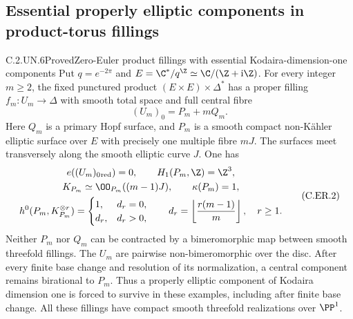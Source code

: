 \subsection{Essential properly elliptic components in product-torus fillings}

\begin{statement}{C.2.UN.6}{Proved}{Zero-Euler product fillings with essential Kodaira-dimension-one components}
Put $q=e^{-2\pi}$ and $E=\C^*/q^{\Z}\simeq\C/(\Z+\mathrm i\Z)$.
For every integer $m\ge2$, the fixed punctured product
$(E\times E)\times\Delta^*$ has a proper filling
$f_m:U_m\to\Delta$ with smooth total space and full central fibre
\[
                    (U_m)_0=P_m+mQ_m.             \tag{C.ER.1}
\]
Here $Q_m$ is a primary Hopf surface, and $P_m$ is a smooth compact
non-K\"ahler elliptic surface over $E$ with precisely one multiple
fibre $mJ$. The surfaces meet transversely along the smooth elliptic
curve $J$. One has
\[
 \begin{gathered}
 e((U_m)_0{}_{\rm red})=0,\qquad H_1(P_m,\Z)=\Z^3,\\
 K_{P_m}\simeq\OO_{P_m}((m-1)J),\qquad \kappa(P_m)=1,\\
 h^0(P_m,K_{P_m}^{\otimes r})=
 \begin{cases}
 1,&d_r=0,\\
 d_r,&d_r>0,
 \end{cases}
 \qquad d_r=\left\lfloor\frac{r(m-1)}m\right\rfloor,
 \quad r\ge1.
 \end{gathered}                                   \tag{C.ER.2}
\]
Neither $P_m$ nor $Q_m$ can be contracted by a bimeromorphic map
between smooth threefold fillings. The $U_m$ are pairwise
non-bimeromorphic over the disc. After every finite base change and
resolution of its normalization, a central component remains
birational to $P_m$. Thus a properly elliptic component of Kodaira
dimension one is forced to survive in these examples, including
after finite base change. All these fillings have compact smooth
threefold realizations over $\PP^1$.
\end{statement}
